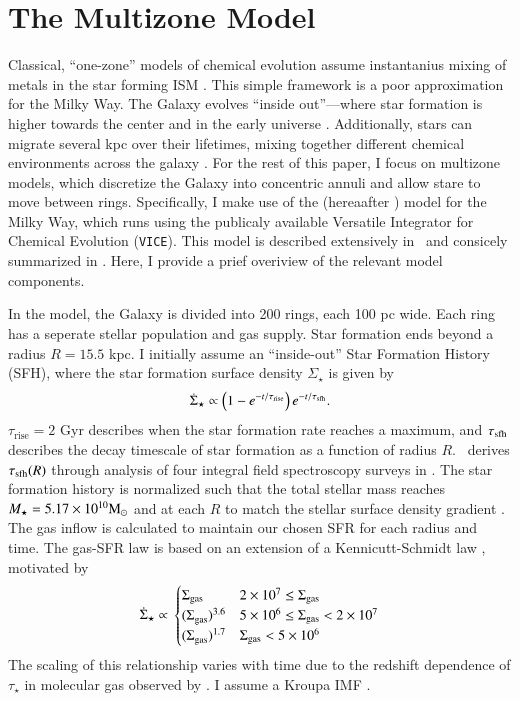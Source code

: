 \documentclass[12pt,oneside]{report}
\newcommand{\JJ}{\citetalias{james+21}}
\newcommand{\VICE}{\texttt{VICE}}
\begin{document}
\chapter{The Multizone Model}\label{sec:vice}

Classical, ``one-zone'' models of chemical evolution assume instantanius mixing of metals in the star forming ISM \citep[e.g.][]{matteucci21}. This simple framework is a poor approximation for the Milky Way.  The Galaxy evolves ``inside out''---where star formation is higher towards the center and in the early universe \citep{bird+13}. Additionally, stars can migrate several kpc over their lifetimes, mixing together different chemical environments across the galaxy \citep{bird+12,sellwood+binney02}. For the rest of this paper, I focus on multizone models, which discretize the Galaxy into concentric annuli and allow stare to move between rings.  Specifically, I make use of the \citet{james+21} (hereaafter \JJ) model for the Milky Way, which runs using the publicaly available Versatile Integrator for Chemical Evolution (\VICE). This model is described extensively in \JJ~and consicely summarized  in \citet{james+23}. Here, I provide a prief overiview of the relevant model components.

In the model, the Galaxy is divided into 200 rings, each 100 pc wide. Each ring has a seperate stellar population and gas supply. Star formation ends beyond a radius $R=15.5$ kpc. I initially assume an ``inside-out'' Star Formation History (SFH), where the star formation surface density $\Sigma_\star$ is given by 
\begin{equation}
    \dot{\Sigma}_\star \propto \left(1-e^{-t/\tau_{\rm rise}}\right) e^{-t/\tau_{\rm sfh}}.
\end{equation}
$\tau_\text{rise}=2$ Gyr describes when the star formation rate reaches a maximum, and $\tau_{\rm sfh}$ describes the decay timescale of star formation as a function of radius $R$. \JJ~derives $\tau_{\rm sfh}(R)$ through analysis of four integral field spectroscopy surveys in \cite{sanches20}. The star formation history is normalized such that the total stellar mass reaches $M_\star=5.17\times10^{10} {\rm M}_\odot$ \citep{LM15} and at each $R$ to match the stellar surface density gradient \citep{BHG16}.
The gas inflow is calculated to maintain our chosen SFR for each radius and time. The gas-SFR law is based on an extension of a Kennicutt-Schmidt law \citep{kennicutt98}, motivated by 
\begin{equation}
\dot{\Sigma}_{\star} \propto \\
\begin{cases}
    {\Sigma}_{\rm gas} & 2\times 10^7 \leq \Sigma_{\rm gas} \\ 
    {(\Sigma}_{\rm gas})^{3.6} & 5\times 10^6 \leq \Sigma_{\rm gas} < 2\times10^7 \\ 
    {(\Sigma}_{\rm gas})^{1.7} & \Sigma_{\rm gas} < 5\times10^6 \\ 
\end{cases}
\end{equation}
The scaling of this relationship varies with time due to the redshift dependence of $\tau_\star$ in molecular gas observed by \citet{tacconi18}. I assume a Kroupa IMF \cite{kroupa01}.
\end{document}
